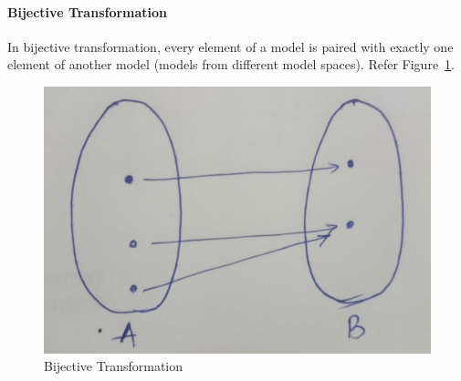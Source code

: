 \paragraph{Bijective Transformation}  In bijective transformation, every element of a model is paired with exactly one element of another model (models from different model spaces).
Refer Figure~\ref{fig:Bijective}.
\begin{figure}
	\includegraphics[width=1\textwidth]{figures/Bijective}
	\caption{Bijective Transformation}
	\label{fig:Bijective}
\end{figure}

 



